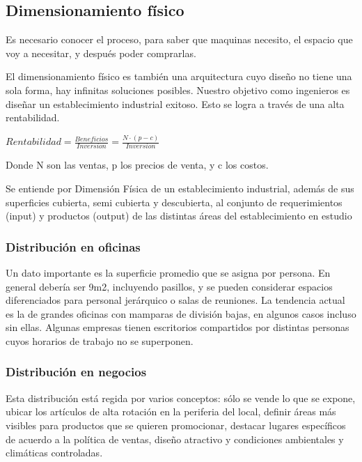 \documentclass[titlepage,a4paper]{article}
\begin{document}
\subsection{Dimensionamiento físico}

Es necesario conocer el proceso, para saber que maquinas necesito, el espacio que voy a necesitar, y después poder comprarlas.

El dimensionamiento físico es también una arquitectura cuyo diseño no tiene una sola forma, hay infinitas soluciones posibles. Nuestro objetivo como ingenieros es diseñar un establecimiento industrial exitoso. Esto se logra a través de una alta rentabilidad.

\medskip

\begin{math}
Rentabilidad = \frac{Beneficios}{Inversion} = \frac{N \cdot (p - c)}{Inversion}
\end{math}
\medskip

Donde N son las ventas, p los precios de venta, y c los costos.

Se entiende por Dimensión Física de un establecimiento industrial, además de sus superficies cubierta, semi cubierta y descubierta, al conjunto de requerimientos (input) y productos (output) de las distintas áreas del establecimiento en estudio

\subsubsection*{Distribución en oficinas}
Un dato importante es la superficie promedio que se asigna por persona. En general debería ser 9m2, incluyendo pasillos, y se pueden considerar espacios diferenciados para personal jerárquico o salas de reuniones. La tendencia actual es la de grandes oficinas con mamparas de división bajas, en algunos casos incluso sin ellas. Algunas empresas tienen escritorios compartidos por distintas personas cuyos horarios de trabajo no se superponen.

\subsubsection*{Distribución en negocios}
Esta distribución está regida por varios conceptos: sólo se vende lo que se expone, ubicar los artículos de alta rotación en la periferia del local, definir áreas más visibles para productos que se quieren promocionar, destacar lugares específicos de acuerdo a la política de ventas, diseño atractivo y condiciones ambientales y climáticas controladas.
\end{document}
